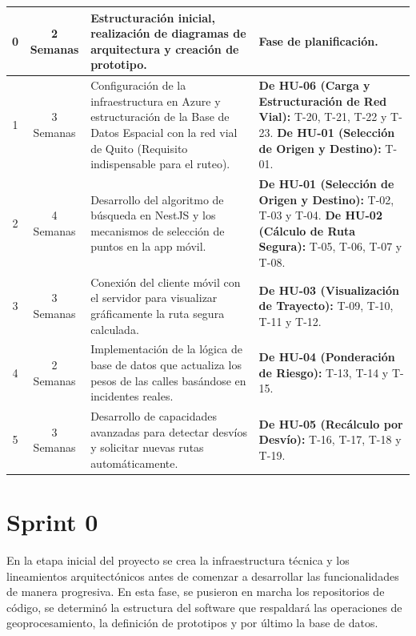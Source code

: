 \begin{longtable}{|c|c|p{5.5cm}|p{5.5cm}|}
0 & 2 Semanas & Estructuración inicial, realización de diagramas de arquitectura y creación de prototipo. & Fase de planificación. \\
\hline
1 & 3 Semanas & Configuración de la infraestructura en Azure y estructuración de la Base de Datos Espacial con la red vial de Quito (Requisito indispensable para el ruteo). & \textbf{De HU-06 (Carga y Estructuración de Red Vial):} \newline T-20, T-21, T-22 y T-23. \newline \newline \textbf{De HU-01 (Selección de Origen y Destino):} \newline T-01. \\
\hline
2 & 4 Semanas & Desarrollo del algoritmo de búsqueda en NestJS y los mecanismos de selección de puntos en la app móvil. & \textbf{De HU-01 (Selección de Origen y Destino):} \newline T-02, T-03 y T-04. \newline \newline \textbf{De HU-02 (Cálculo de Ruta Segura):} \newline T-05, T-06, T-07 y T-08. \\
\hline
3 & 3 Semanas & Conexión del cliente móvil con el servidor para visualizar gráficamente la ruta segura calculada. & \textbf{De HU-03 (Visualización de Trayecto):} \newline T-09, T-10, T-11 y T-12. \\
\hline
4 & 2 Semanas & Implementación de la lógica de base de datos que actualiza los pesos de las calles basándose en incidentes reales. & \textbf{De HU-04 (Ponderación de Riesgo):} \newline T-13, T-14 y T-15. \\
\hline
5 & 3 Semanas & Desarrollo de capacidades avanzadas para detectar desvíos y solicitar nuevas rutas automáticamente. & \textbf{De HU-05 (Recálculo por Desvío):} \newline T-16, T-17, T-18 y T-19. \\
\hline

\end{longtable}

\section{Sprint 0}

En la etapa inicial del proyecto se crea la infraestructura técnica y los lineamientos arquitectónicos antes de comenzar a desarrollar las funcionalidades de manera progresiva. En esta fase, se pusieron en marcha los repositorios de código, se determinó la estructura del software que respaldará las operaciones de geoprocesamiento, la definición de prototipos y por último la base de datos.

